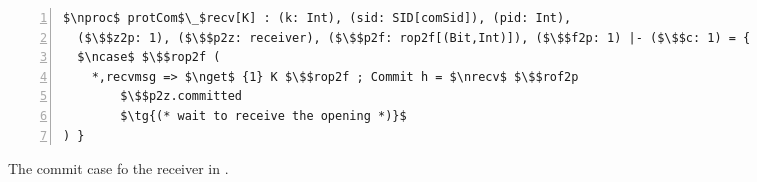 \centering
\begin{lstlisting}[basicstyle=\scriptsize\BeraMonottFamily, frame=single, mathescape, numbers=left, xleftmargin=2em, xrightmargin=2em]
$\nproc$ protCom$\_$recv[K] : (k: Int), (sid: SID[comSid]), (pid: Int), 
  ($\$$z2p: 1), ($\$$p2z: receiver), ($\$$p2f: rop2f[(Bit,Int)]), ($\$$f2p: 1) |- ($\$$c: 1) = {
  $\ncase$ $\$$rop2f (
    *,recvmsg => $\nget$ {1} K $\$$rop2f ; Commit h = $\nrecv$ $\$$rof2p
        $\$$p2z.committed 
        $\tg{(* wait to receive the opening *)}$
) }
\end{lstlisting}
\vspace{-0.5em}
\caption{The commit case fo the receiver in \protcom.}
\label{fig:protcomreceiver}
